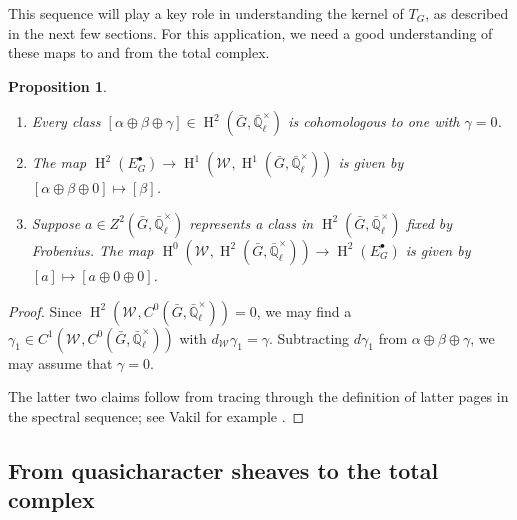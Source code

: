 \documentclass{amsart}
\theoremstyle{plain}
\newtheorem{proposition}[theorem]{Proposition}
\theoremstyle{definition}
\theoremstyle{remark}
\newcommand{\EE}{\mathbb{\bar Q}_\ell}
\newcommand{\EEx}{\EE^\times}
\newcommand{\Weil}[1]{\mathcal{W}_{#1}}
\DeclareMathOperator{\Hh}{H}
\begin{document}
This sequence will play a key role in understanding the kernel of $T_G$, as described in the next few sections.
For this application, we need a good understanding of these maps to and from the total complex.

\begin{proposition} \label{prop:ses_desc}
\begin{enumerate}
\item Every class $[\alpha\oplus\beta\oplus\gamma] \in \Hh^2({\bar G},\EEx)$ is cohomologous to one with $\gamma=0$.
\item The map $\Hh^2(E^\bullet_G) \to \Hh^1(\Weil{},\Hh^1({\bar G},\EEx))$ is given by $[\alpha\oplus\beta\oplus 0] \mapsto [\beta]$.
\item Suppose $a \in Z^2({\bar G}, \EEx)$ represents a class in $\Hh^2({\bar G},\EEx)$ fixed by Frobenius.
The map $\Hh^0(\Weil{},\Hh^2({\bar G},\EEx)) \to \Hh^2(E^\bullet_G)$ is given by $[a] \mapsto [a \oplus 0 \oplus 0]$.
\end{enumerate}
\end{proposition}
\begin{proof}
Since $\Hh^2(\Weil{}, C^0({\bar G}, \EEx)) = 0$, we may find a $\gamma_1 \in C^1(\Weil{}, C^0({\bar G}, \EEx))$ with $d_{\Weil{}}\gamma_1 = \gamma$.
Subtracting $d \gamma_1$ from $\alpha\oplus\beta\oplus\gamma$, we may assume that $\gamma = 0$.

The latter two claims follow from tracing through the definition of latter pages in the spectral sequence; see Vakil \cite{} for example .
\end{proof}

\subsection{From quasicharacter sheaves to the total complex}\label{sec:S}
\end{document}
